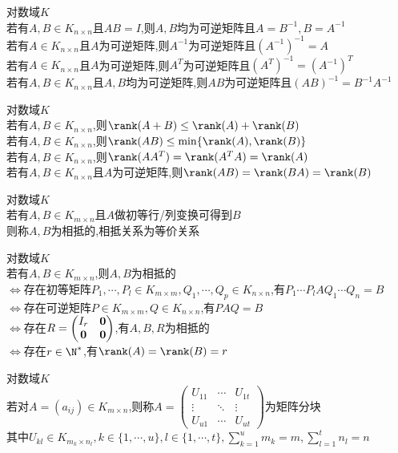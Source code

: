 \begin{dingli}
对数域$K$\\
若有$A,B\in K_{n\times n}$且$AB=I$,则$A,B$均为可逆矩阵且$A=B^{-1},B=A^{-1}$\\
若有$A\in K_{n\times n}$且$A$为可逆矩阵,则$A^{-1}$为可逆矩阵且$(A^{-1})^{-1}=A$\\
若有$A\in K_{n\times n}$且$A$为可逆矩阵,则$A^{T}$为可逆矩阵且$(A^{T})^{-1}=(A^{-1})^{T}$\\
若有$A,B\in K_{n\times n}$且$A,B$均为可逆矩阵,则$AB$为可逆矩阵且$(AB)^{-1}=B^{-1}A^{-1}$
\end{dingli}

\begin{dingli}
对数域$K$\\
若有$A,B\in K_{n\times n}$,则$\rank(A+B)\leq\rank(A)+\rank(B)$\\
若有$A,B\in K_{n\times n}$,则$\rank(AB)\leq\min\{\rank(A),\rank(B)\}$\\
若有$A,B\in K_{n\times n}$,则$\rank(AA^{T})=\rank(A^{T}A)=\rank(A)$\\
若有$A,B\in K_{n\times n}$且$A$为可逆矩阵,则$\rank(AB)=\rank(BA)=\rank(B)$
\end{dingli}

\begin{dingyi}
对数域$K$\\
若有$A,B\in K_{m\times n}$且$A$做初等行/列变换可得到$B$\\
则称$A,B$为相抵的,相抵关系为等价关系
\end{dingyi}

\begin{dingli}
对数域$K$\\
若有$A,B\in K_{m\times n}$,则$A,B$为相抵的\\
$\Leftrightarrow$存在初等矩阵$P_1,\cdots,P_l\in K_{m\times m},Q_1,\cdots,Q_p\in K_{n\times n}$,有$P_1\cdots P_lAQ_1\cdots Q_n=B$\\
$\Leftrightarrow$存在可逆矩阵$P\in K_{m\times m},Q\in K_{n\times n}$,有$PAQ=B$\\
$\Leftrightarrow$存在$R=\begin{pmatrix}I_r&\bf0\\ \bf0&\bf0\end{pmatrix}$,有$A,B,R$为相抵的\\
$\Leftrightarrow$存在$r\in \N^*$,有$\rank(A)=\rank(B)=r$
\end{dingli}

\begin{dingyi}
对数域$K$\\
若对$A=(a_{ij})\in K_{m\times n}$,则称$A=\begin{pmatrix}U_{11}&\cdots&U_{1t}\\ \vdots&\ddots&\vdots\\ U_{u1}&\cdots&U_{ut}\end{pmatrix}$为矩阵分块\\
其中$U_{kl}\in K_{m_k\times n_l},k\in\{1,\cdots,u\},l\in \{1,\cdots,t\},\sum\limits_{k=1}^{u}m_k=m,\sum\limits_{l=1}^{t}n_l=n$
\end{dingyi}

